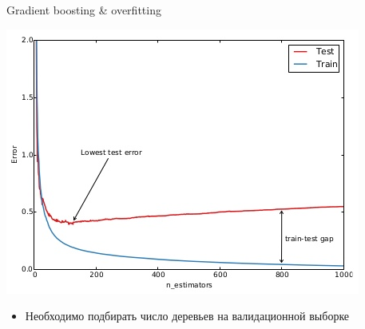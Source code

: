 \documentclass[10pt]{beamer}
\begin{document}
\begin{frame}{Gradient boosting \& overfitting}
\begin{center}
    \includegraphics[scale=0.4]{images/gbtover.png}
\end{center}
\begin{itemize}
    \item Необходимо подбирать число деревьев на валидационной выборке
\end{itemize}
\end{frame}
\end{document}
